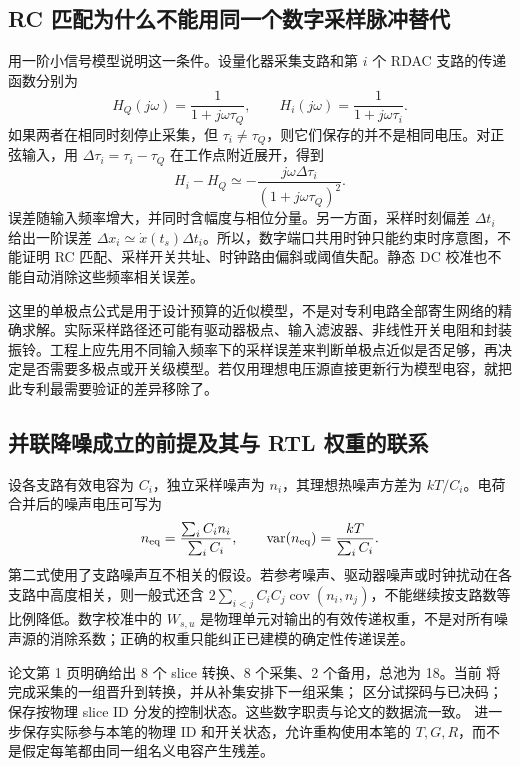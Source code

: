 \subsection{RC 匹配为什么不能用同一个数字采样脉冲替代}
用一阶小信号模型说明这一条件。设量化器采集支路和第 \(i\) 个 RDAC 支路的传递函数分别为
\begin{equation}
H_Q(j\omega)=\frac{1}{1+j\omega\tau_Q},\qquad
H_i(j\omega)=\frac{1}{1+j\omega\tau_i}.
\end{equation}
如果两者在相同时刻停止采集，但 \(\tau_i\ne\tau_Q\)，则它们保存的并不是相同电压。对正弦输入，用 \(\Delta\tau_i=\tau_i-\tau_Q\) 在工作点附近展开，得到
\begin{equation}
H_i-H_Q\simeq-\frac{j\omega\Delta\tau_i}{(1+j\omega\tau_Q)^2}.
\end{equation}
误差随输入频率增大，并同时含幅度与相位分量。另一方面，采样时刻偏差 \(\Delta t_i\) 给出一阶误差 \(\Delta x_i\simeq\dot{x}(t_s)\Delta t_i\)。所以，数字端口共用时钟只能约束时序意图，不能证明 RC 匹配、采样开关共址、时钟路由偏斜或阈值失配。静态 DC 校准也不能自动消除这些频率相关误差。

这里的单极点公式是用于设计预算的近似模型，不是对专利电路全部寄生网络的精确求解。实际采样路径还可能有驱动器极点、输入滤波器、非线性开关电阻和封装振铃。工程上应先用不同输入频率下的采样误差来判断单极点近似是否足够，再决定是否需要多极点或开关级模型。若仅用理想电压源直接更新行为模型电容，就把此专利最需要验证的差异移除了。

\subsection{并联降噪成立的前提及其与 RTL 权重的联系}
设各支路有效电容为 \(C_i\)，独立采样噪声为 \(n_i\)，其理想热噪声方差为 \(kT/C_i\)。电荷合并后的噪声电压可写为
\begin{equation}
n_{\rm eq}=\frac{\sum_i C_i n_i}{\sum_i C_i},\qquad
\operatorname{var}(n_{\rm eq})=\frac{kT}{\sum_i C_i}.
\end{equation}
第二式使用了支路噪声互不相关的假设。若参考噪声、驱动器噪声或时钟扰动在各支路中高度相关，则一般式还含 \(2\sum_{i<j}C_iC_j\operatorname{cov}(n_i,n_j)\)，不能继续按支路数等比例降低。数字校准中的 \(W_{s,u}\) 是物理单元对输出的有效传递权重，不是对所有噪声源的消除系数；正确的权重只能纠正已建模的确定性传递误差。

论文第 1 页明确给出 8 个 slice 转换、8 个采集、2 个备用，总池为 18。当前  将完成采集的一组晋升到转换，并从补集安排下一组采集； 区分试探码与已决码； 保存按物理 slice ID 分发的控制状态。这些数字职责与论文的数据流一致。 进一步保存实际参与本笔的物理 ID 和开关状态，允许重构使用本笔的 \(T,G,R\)，而不是假定每笔都由同一组名义电容产生残差。


